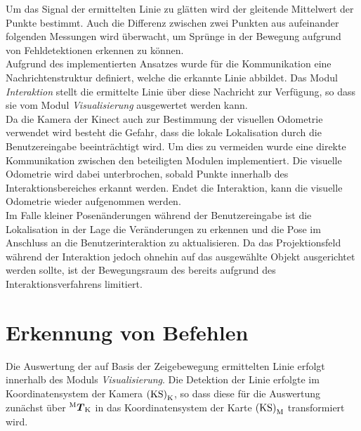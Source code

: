 Um das Signal der ermittelten Linie zu glätten wird der gleitende Mittelwert der Punkte bestimmt. Auch die Differenz zwischen zwei Punkten aus aufeinander folgenden Messungen wird überwacht, um Sprünge in der Bewegung aufgrund von Fehldetektionen erkennen zu können.\\
Aufgrund des implementierten Ansatzes wurde für die Kommunikation eine Nachrichtenstruktur definiert, welche die erkannte Linie abbildet. Das Modul \textit{Interaktion} stellt die ermittelte Linie über diese Nachricht zur Verfügung, so dass sie vom Modul \textit{Visualisierung} ausgewertet werden kann.\\

Da die Kamera der Kinect auch zur Bestimmung der visuellen Odometrie verwendet wird besteht die Gefahr, dass die lokale Lokalisation durch die Benutzereingabe beeinträchtigt wird. Um dies zu vermeiden wurde eine direkte Kommunikation zwischen den beteiligten Modulen implementiert. Die visuelle Odometrie wird dabei unterbrochen, sobald Punkte innerhalb des Interaktionsbereiches erkannt werden. Endet die Interaktion, kann die visuelle Odometrie wieder aufgenommen werden.\\
Im Falle kleiner Posenänderungen während der Benutzereingabe ist die Lokalisation in der Lage die Veränderungen zu erkennen und die Pose im Anschluss an die Benutzerinteraktion zu aktualisieren. Da das Projektionsfeld während der Interaktion jedoch ohnehin auf das ausgewählte Objekt ausgerichtet werden sollte, ist der Bewegungsraum des  bereits aufgrund des Interaktionsverfahrens limitiert.\\

\section{Erkennung von Befehlen}
Die Auswertung der auf Basis der Zeigebewegung ermittelten Linie erfolgt innerhalb des Moduls \textit{Visualisierung}. Die Detektion der Linie erfolgte im Koordinatensystem der Kamera ${\mathrm{(KS)}}_{\mathrm{K}}$, so dass diese für die Auswertung zunächst über ${^{\mathrm{M}}\mbox{\boldmath{$T$}}_{\mathrm{K}}}$ in das Koordinatensystem der Karte ${\mathrm{(KS)}}_{\mathrm{M}}$ transformiert wird.\\

